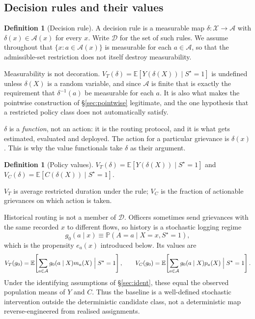 \documentclass[11pt,a4paper]{article}
\theoremstyle{plain}
\theoremstyle{definition}
\newtheorem{definition}[theorem]{Definition}
\theoremstyle{remark}
\newcommand{\E}{\mathbb E}
\newcommand{\Prob}{\mathbb P}
\newcommand{\Sstar}{S^{\star}}
\begin{document}
\subsection{Decision rules and their values}

\begin{definition}[Decision rule]\label{def:rule}
A decision rule is a measurable map $\delta:\mathcal X\to\mathcal A$ with
$\delta(x)\in\mathcal A(x)$ for every $x$. Write $\mathcal D$ for the set of such rules. We
assume throughout that $\{x:a\in\mathcal A(x)\}$ is measurable for each $a\in\mathcal A$, so that
the admissible-set restriction does not itself destroy measurability.
\end{definition}

Measurability is not decoration. $V_T(\delta)=\E[Y(\delta(X))\mid \Sstar=1]$ is undefined unless
$\delta(X)$ is a random variable, and since $\mathcal A$ is finite that is exactly the
requirement that $\delta^{-1}(a)$ be measurable for each $a$. It is also what makes the pointwise
construction of \S\ref{sec:pointwise} legitimate, and the one hypothesis that a restricted policy
class does not automatically satisfy.

$\delta$ is a \emph{function}, not an action: it is the routing protocol, and it is what gets
estimated, evaluated and deployed. The action for a particular grievance is $\delta(x)$. This is
why the value functionals take $\delta$ as their argument.

\begin{definition}[Policy values]\label{def:values}
$V_T(\delta)=\E[Y(\delta(X))\mid \Sstar=1]$ and
$V_C(\delta)=\E[C(\delta(X))\mid \Sstar=1]$.
\end{definition}

$V_T$ is average restricted duration under the rule; $V_C$ is the fraction of actionable
grievances on which action is taken.

Historical routing is not a member of $\mathcal D$. Officers sometimes send grievances with
the same recorded $x$ to different flows, so history is a stochastic logging regime
\[
g_0(a\mid x)\equiv\Prob(A=a\mid X=x,\Sstar=1),
\]
which is the propensity $e_a(x)$ introduced below. Its values are
\begin{equation}
V_T(g_0)=\E\!\left[\sum_{a\in\mathcal A}g_0(a\mid X)m_a(X)\Bigm|\Sstar=1\right],
\qquad
V_C(g_0)=\E\!\left[\sum_{a\in\mathcal A}g_0(a\mid X)p_a(X)\Bigm|\Sstar=1\right].
\label{eq:logging-values}
\end{equation}
Under the identifying assumptions of \S\ref{sec:ident}, these equal the observed population
means of $Y$ and $C$. Thus the baseline is a well-defined stochastic intervention outside the
deterministic candidate class, not a deterministic map reverse-engineered from realised
assignments.
\end{document}
